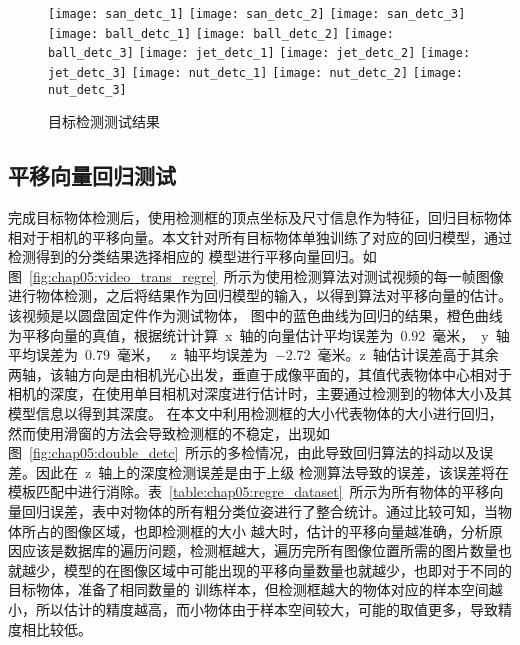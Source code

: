 \begin{figure}[t] %
    \centering%
      \texttt{[image: san\_detc\_1]}
      \texttt{[image: san\_detc\_2]}
      \texttt{[image: san\_detc\_3]}
      \vskip 1pt
      \texttt{[image: ball\_detc\_1]}
      \texttt{[image: ball\_detc\_2]}
      \texttt{[image: ball\_detc\_3]}
      \vskip 1pt
      \texttt{[image: jet\_detc\_1]}
      \texttt{[image: jet\_detc\_2]}
      \texttt{[image: jet\_detc\_3]}
      \vskip 1pt
      \texttt{[image: nut\_detc\_1]}
      \texttt{[image: nut\_detc\_2]}
      \texttt{[image: nut\_detc\_3]}
    \caption{目标检测测试结果}
    \label{fig:chap05:obj_detec_test_res}
    \end{figure}


\subsection{平移向量回归测试}
\label{sec:trans_regress_test}
完成目标物体检测后，使用检测框的顶点坐标及尺寸信息作为特征，回归目标物体相对于相机的平移向量。本文针对所有目标物体单独训练了对应的回归模型，通过检测得到的分类结果选择相应的
模型进行平移向量回归。如图~\ref{fig:chap05:video_trans_regre}~所示为使用检测算法对测试视频的每一帧图像进行物体检测，之后将结果作为回归模型的输入，以得到算法对平移向量的估计。该视频是以圆盘固定件作为测试物体，
图中的蓝色曲线为回归的结果，橙色曲线为平移向量的真值，根据统计计算~x~轴的向量估计平均误差为~$0.92$~毫米，~y~轴平均误差为~$0.79$~毫米，
~z~轴平均误差为~$-2.72$~毫米。z~轴估计误差高于其余两轴，该轴方向是由相机光心出发，垂直于成像平面的，其值代表物体中心相对于相机的深度，在使用单目相机对深度进行估计时，主要通过检测到的物体大小及其模型信息以得到其深度。
在本文中利用检测框的大小代表物体的大小进行回归，然而使用滑窗的方法会导致检测框的不稳定，出现如图~\ref{fig:chap05:double_detc}~所示的多检情况，由此导致回归算法的抖动以及误差。因此在~z~轴上的深度检测误差是由于上级
检测算法导致的误差，该误差将在模板匹配中进行消除。表~\ref{table:chap05:regre_dataset}~所示为所有物体的平移向量回归误差，表中对物体的所有粗分类位姿进行了整合统计。通过比较可知，当物体所占的图像区域，也即检测框的大小
越大时，估计的平移向量越准确，分析原因应该是数据库的遍历问题，检测框越大，遍历完所有图像位置所需的图片数量也就越少，模型的在图像区域中可能出现的平移向量数量也就越少，也即对于不同的目标物体，准备了相同数量的
训练样本，但检测框越大的物体对应的样本空间越小，所以估计的精度越高，而小物体由于样本空间较大，可能的取值更多，导致精度相比较低。

